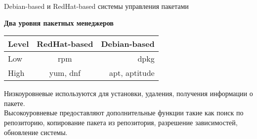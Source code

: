\begin{frame}{Debian-based и RedHat-based системы управления пакетами}

\begin{center}
 \textbf{Два уровня пакетных менеджеров}
\end{center}

\begin{tabular}{| l | c | r |}
      \hline
          Level &  RedHat-based & Debian-based \\ 
      \hline
          Low & rpm & dpkg \\ 
      \hline
          High & yum, dnf & apt, aptitude \\
      \hline
    \end{tabular}

    Низкоуровневые используются для установки, удаления, получения информации о пакете. \\
    Высокоуровневые предоставляют дополнительные функции такие как поиск по репозиторию, копирование пакета из репозитория, разрешение зависимостей, обновление системы.

\end{frame}

